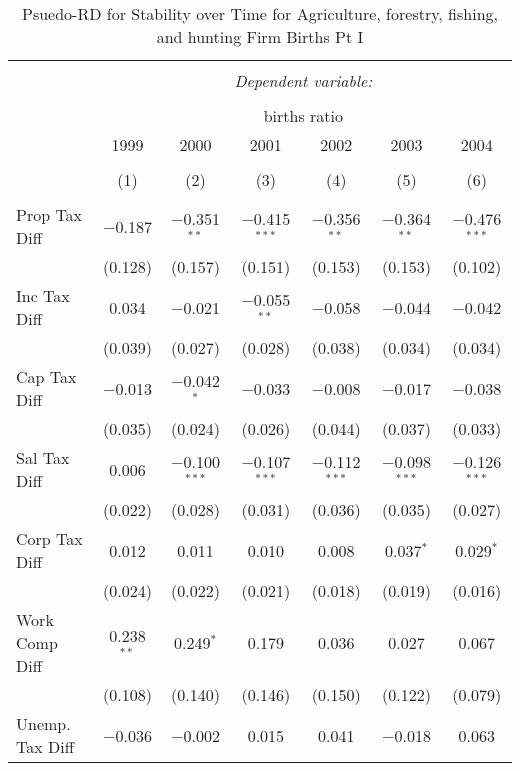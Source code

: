 
\begin{table}[!htbp] \centering 
  \caption{Psuedo-RD for Stability over Time for  Agriculture, forestry, fishing, and hunting Firm Births Pt I} 
  \label{11year} 
\small 
\begin{tabular}{@{\extracolsep{5pt}}lcccccc} 
\\[-1.8ex]\hline 
\hline \\[-1.8ex] 
 & \multicolumn{6}{c}{\textit{Dependent variable:}} \\ 
\cline{2-7} 
\\[-1.8ex] & \multicolumn{6}{c}{births ratio} \\ 
 & 1999 & 2000 & 2001 & 2002 & 2003 & 2004 \\ 
\\[-1.8ex] & (1) & (2) & (3) & (4) & (5) & (6)\\ 
\hline \\[-1.8ex] 
 Prop Tax Diff & $-$0.187 & $-$0.351$^{**}$ & $-$0.415$^{***}$ & $-$0.356$^{**}$ & $-$0.364$^{**}$ & $-$0.476$^{***}$ \\ 
  & (0.128) & (0.157) & (0.151) & (0.153) & (0.153) & (0.102) \\ 
  Inc Tax Diff & 0.034 & $-$0.021 & $-$0.055$^{**}$ & $-$0.058 & $-$0.044 & $-$0.042 \\ 
  & (0.039) & (0.027) & (0.028) & (0.038) & (0.034) & (0.034) \\ 
  Cap Tax Diff & $-$0.013 & $-$0.042$^{*}$ & $-$0.033 & $-$0.008 & $-$0.017 & $-$0.038 \\ 
  & (0.035) & (0.024) & (0.026) & (0.044) & (0.037) & (0.033) \\ 
  Sal Tax Diff & 0.006 & $-$0.100$^{***}$ & $-$0.107$^{***}$ & $-$0.112$^{***}$ & $-$0.098$^{***}$ & $-$0.126$^{***}$ \\ 
  & (0.022) & (0.028) & (0.031) & (0.036) & (0.035) & (0.027) \\ 
  Corp Tax Diff & 0.012 & 0.011 & 0.010 & 0.008 & 0.037$^{*}$ & 0.029$^{*}$ \\ 
  & (0.024) & (0.022) & (0.021) & (0.018) & (0.019) & (0.016) \\ 
  Work Comp Diff & 0.238$^{**}$ & 0.249$^{*}$ & 0.179 & 0.036 & 0.027 & 0.067 \\ 
  & (0.108) & (0.140) & (0.146) & (0.150) & (0.122) & (0.079) \\ 
  Unemp. Tax Diff & $-$0.036 & $-$0.002 & 0.015 & 0.041 & $-$0.018 & 0.063 \\ 

\end{tabular}
\end{table}
